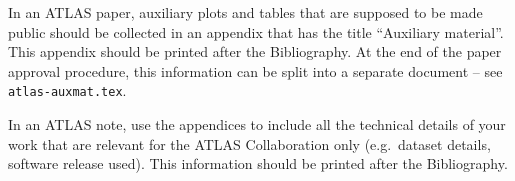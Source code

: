 \documentclass[UKenglish,texlive=2013]{latex/atlasdoc}
\begin{document}
In an ATLAS paper, auxiliary plots and tables that are supposed to be made public 
should be collected in an appendix that has the title \enquote{Auxiliary material}.
This appendix should be printed after the Bibliography.
At the end of the paper approval procedure, this information can be split into a separate document
-- see \texttt{atlas-auxmat.tex}.

In an ATLAS note, use the appendices to include all the technical details of your work
that are relevant for the ATLAS Collaboration only (e.g.\ dataset details, software release used).
This information should be printed after the Bibliography.
\end{document}
